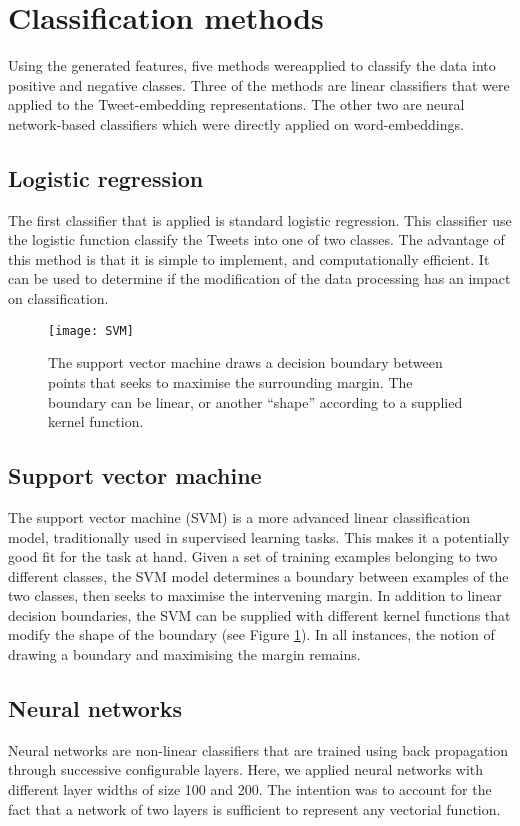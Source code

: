 \section{Classification methods}
\label{sec:methods}
Using the generated features, five methods wereapplied to classify the data into positive and negative classes. Three of the methods are linear classifiers that were applied to the Tweet-embedding representations. The other two are neural network-based classifiers which were directly applied on word-embeddings.

\subsection{Logistic regression}
The first classifier that is applied is standard logistic regression. This classifier use the logistic function classify the Tweets into one of two classes. The advantage of this method is that it is simple to implement, and computationally efficient. It can be used to determine if the modification of the data processing has an impact on classification.

\begin{figure}[h!]
\centering
	\texttt{[image: SVM]} 
\caption{The support vector machine draws a decision boundary between points that seeks to maximise the surrounding margin. The boundary can be linear, or another ``shape'' according to a supplied kernel function. \cite{wikiSVM}}
\label{plot:SVM}
\end{figure}
\FloatBarrier

\subsection{Support vector machine}
The support vector machine (SVM) is a more advanced linear classification model, traditionally used in supervised learning tasks. This makes it a potentially good fit for the task at hand. Given a set of training examples belonging to two different classes, the SVM model determines a boundary between examples of the two classes, then seeks to maximise the intervening margin. In addition to linear decision boundaries, the SVM can be supplied with different kernel functions that modify the shape of the boundary (see Figure \ref{plot:SVM}). In all instances, the notion of drawing a boundary and maximising the margin remains.

\subsection{Neural networks}
Neural networks are non-linear classifiers that are trained using back propagation through successive configurable layers. Here, we applied neural networks with different layer widths of size 100 and 200. The intention was to account for the fact that a network of two layers is sufficient to represent any vectorial function.


